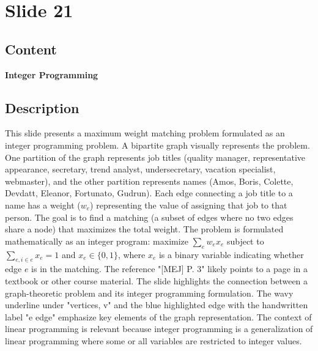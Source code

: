 \documentclass{article}%
\begin{document}
%
\newpage%
\section{Slide 21}%
\label{sec:Slide21}%
\subsection{Content}%

\textbf{Integer Programming} \\
\underline{} \quad {}
%
\subsection{Description}%
This slide presents a maximum weight matching problem formulated as an integer programming problem.  A bipartite graph visually represents the problem. One partition of the graph represents job titles (quality manager, representative appearance, secretary, trend analyst, undersecretary, vacation specialist, webmaster), and the other partition represents names (Amos, Boris, Colette, Devdatt, Eleanor, Fortunato, Gudrun).  Each edge connecting a job title to a name has a weight ($w_e$) representing the value of assigning that job to that person. The goal is to find a matching (a subset of edges where no two edges share a node) that maximizes the total weight. The problem is formulated mathematically as an integer program: maximize $\sum_{e} w_e x_e$ subject to $\sum_{e, i \in e} x_e = 1$ and $x_e \in \{0, 1\}$, where $x_e$ is a binary variable indicating whether edge $e$ is in the matching. The reference "[MEJ] P. 3" likely points to a page in a textbook or other course material.  The slide highlights the connection between a graph-theoretic problem and its integer programming formulation.  The wavy underline under "vertices, v" and the blue highlighted edge with the handwritten label "e edge" emphasize key elements of the graph representation. The context of linear programming is relevant because integer programming is a generalization of linear programming where some or all variables are restricted to integer values.%
\end{document}
